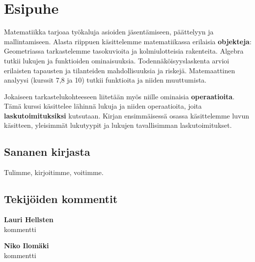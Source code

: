 


\chapter{Esipuhe}



Matematiikka tarjoaa työkaluja asioiden jäsentämiseen, päättelyyn ja mallintamiseen. Alasta riippuen käsittelemme matematiikassa erilaisia \textbf{objekteja}: Geometriassa tarkastelemme tasokuvioita ja kolmiulotteisia rakenteita. Algebra tutkii lukujen ja funktioiden ominaisuuksia. Todennäköisyyslaskenta arvioi erilaisten tapausten ja tilanteiden mahdollisuuksia ja riskejä. Matemaattinen analyysi (kurssit 7,8 ja 10) tutkii funktioita ja niiden muuttumista.

Jokaiseen tarkastelukohteeseen liitetään myös niille ominaisia \textbf{operaatioita}. Tämä kurssi käsittelee lähinnä lukuja ja niiden operaatioita, joita \textbf{laskutoimituksiksi} kutsutaan. Kirjan ensimmäisessä osassa käsittelemme luvun käsitteen, yleisimmät lukutyypit ja lukujen tavallisimman laskutoimitukset.

\section*{Sananen kirjasta}

Tulimme, kirjoitimme, voitimme.

\section*{Tekijöiden kommentit}


\textbf{Lauri Hellsten}
\\kommentti

\textbf{Niko Ilomäki}
\\kommentti

